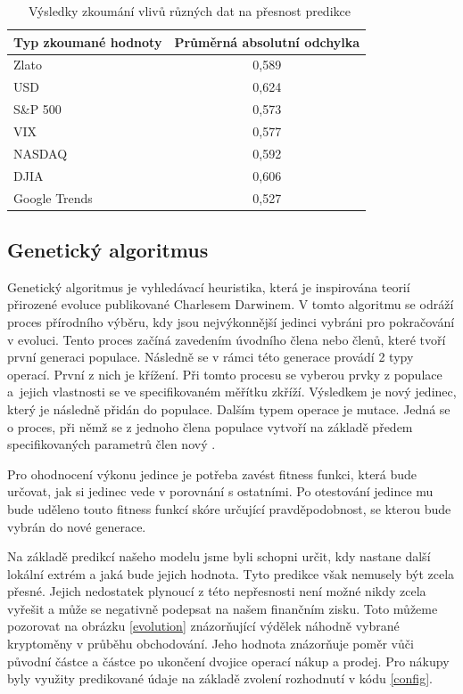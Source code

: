 \begin{table}\centering
\caption{~Výsledky zkoumání vlivů různých dat na přesnost predikce}\label{results}
\begin{tabular}{l|c}
    Typ zkoumané hodnoty & Průměrná absolutní odchylka	\tabularnewline \hline 
     Zlato		    & 0,589	\tabularnewline \hline
     USD		    & 0,624	\tabularnewline \hline
     S\&P 500       & 0,573	\tabularnewline \hline
     VIX		    & 0,577	\tabularnewline \hline
     NASDAQ		    & 0,592	\tabularnewline \hline
     DJIA		    & 0,606	\tabularnewline \hline
     Google Trends	& 0,527	\tabularnewline 
\end{tabular}
\end{table}

\subsection{Genetický algoritmus}

Genetický algoritmus je vyhledávací heuristika, která je inspirována teorií přirozené evoluce publikované Charlesem Darwinem. 
V tomto algoritmu se odráží proces přírodního výběru, kdy jsou nejvýkonnější jedinci vybráni pro pokračování v evoluci. 
Tento proces začíná zavedením úvodního člena nebo členů, které tvoří první generaci populace. 
Následně se v rámci této generace provádí 2 typy operací. 
První z nich je křížení. 
Při tomto procesu se vyberou prvky z populace a~jejich vlastnosti se ve specifikovaném měřítku zkříží. 
Výsledkem je nový jedinec, který je následně přidán do populace. 
Dalším typem operace je mutace. 
Jedná se o proces, při němž se z jednoho člena populace vytvoří na základě předem specifikovaných parametrů člen nový \cite{genetic}.

Pro ohodnocení výkonu jedince je potřeba zavést fitness funkci, která bude určovat, jak si jedinec vede v porovnání s ostatními. 
Po otestování jedince mu bude uděleno touto fitness funkcí skóre určující pravděpodobnost, se kterou bude vybrán do nové generace.

Na základě predikcí našeho modelu jsme byli schopni určit, kdy nastane další lokální extrém a jaká bude jejich hodnota. 
Tyto predikce však nemusely být zcela přesné. 
Jejich nedostatek plynoucí z této nepřesnosti není možné nikdy zcela vyřešit a může se negativně podepsat na našem finančním zisku. 
Toto můžeme pozorovat na obrázku \ref{evolution} znázorňující výdělek náhodně vybrané kryptoměny v průběhu obchodování. 
Jeho hodnota znázorňuje poměr vůči původní částce a částce po ukončení dvojice operací nákup a prodej. 
Pro nákupy byly využity predikované údaje na základě zvolení rozhodnutí v kódu \ref{config}. 

